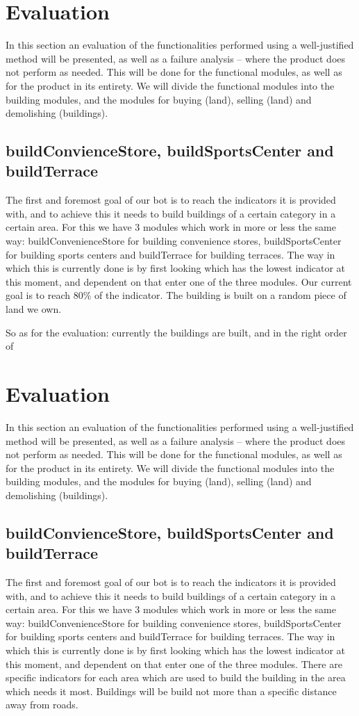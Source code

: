 \section{Evaluation}
In this section an evaluation of the functionalities performed using a well-justified method will be presented, as well as a failure analysis – where the product does not perform as needed. This will be done for the functional modules, as well as for the product in its entirety. We will divide the functional modules into the building modules, and the modules for buying (land), selling (land) and demolishing (buildings).
\subsection{buildConvienceStore, buildSportsCenter and buildTerrace}
The first and foremost goal of our bot is to reach the indicators it is provided with, and to achieve this it needs to build buildings of a certain category in a certain area. For this we have 3 modules which work in more or less the same way: buildConvenienceStore for building convenience stores, buildSportsCenter for building sports centers and buildTerrace for building terraces. The way in which this is currently done is by first looking which has the lowest indicator at this moment, and dependent on that enter one of the three modules. Our current goal is to reach 80\% of the indicator. The building is built on a random piece of land we own. 

So as for the evaluation: currently the buildings are built, and in the right order of \section{Evaluation}
In this section an evaluation of the functionalities performed using a well-justified method will be presented, as well as a failure analysis – where the product does not perform as needed. This will be done for the functional modules, as well as for the product in its entirety. We will divide the functional modules into the building modules, and the modules for buying (land), selling (land) and demolishing (buildings).
\subsection{buildConvienceStore, buildSportsCenter and buildTerrace}
The first and foremost goal of our bot is to reach the indicators it is provided with, and to achieve this it needs to build buildings of a certain category in a certain area. For this we have 3 modules which work in more or less the same way: buildConvenienceStore for building convenience stores, buildSportsCenter for building sports centers and buildTerrace for building terraces. The way in which this is currently done is by first looking which has the lowest indicator at this moment, and dependent on that enter one of the three modules. There are specific indicators for each area which are used to build the building in the area which needs it most. Buildings will be build not more than a specific distance away from roads.

